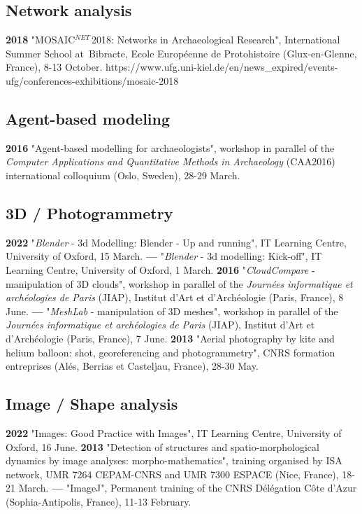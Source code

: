 \documentclass{article}
\begin{document}
\subsection*{Network analysis}

\textbf{2018 }"MOSAIC${}^{NET\ }$2018: Networks in Archaeological Research", International Summer School at~Bibracte, Ecole Europ\'{e}enne de Protohistoire (Glux-en-Glenne, France), 8-13 October. https://www.ufg.uni-kiel.de/en/news_expired/events-ufg/conferences-exhibitions/mosaic-2018

\subsection*{Agent-based modeling}

\textbf{2016 }"Agent-based modelling for archaeologists", workshop in parallel of the \textit{Computer Applications and Quantitative Methods in Archaeology} (CAA2016) international colloquium (Oslo, Sweden), 28-29 March.

\subsection*{3D / Photogrammetry}

\textbf{2022 }"\textit{Blender} - 3d Modelling: Blender - Up and running", IT Learning Centre, University of Oxford, 15 March.
\smallbreak
\textbf{--- }"\textit{Blender} - 3d modelling: Kick-off", IT Learning Centre, University of Oxford, 1 March.
\smallbreak
\textbf{2016 }"\textit{CloudCompare} - manipulation of 3D clouds", workshop in parallel of the \textit{Journ\'{e}es informatique et arch\'{e}ologies de Paris} (JIAP), Institut d'Art et d'Arch\'{e}ologie (Paris, France), 8 June.
\smallbreak
\textbf{--- }"\textit{MeshLab }- manipulation of 3D meshes", workshop in parallel of the \textit{Journ\'{e}es informatique et arch\'{e}ologies de Paris} (JIAP), Institut d'Art et d'Arch\'{e}ologie (Paris, France), 7 June.
\smallbreak
\textbf{2013 }"Aerial photography by kite and helium balloon: shot, georeferencing and photogrammetry", CNRS formation entreprises (Al\'{e}s, Berrias et Casteljau, France), 28-30 May.

\subsection*{Image / Shape analysis}

\textbf{2022 }"Images: Good Practice with Images", IT Learning Centre, University of Oxford, 16 June.
\smallbreak
\textbf{2013 }"Detection of structures and spatio-morphological dynamics by image analyses: morpho-mathematics", training organised by ISA network, UMR 7264 CEPAM-CNRS and UMR 7300 ESPACE (Nice, France), 18-21 March.
\smallbreak
\textbf{--- }"ImageJ", Permanent training of the CNRS D\'{e}l\'{e}gation C\^{o}te d'Azur (Sophia-Antipolis, France), 11-13 February.
\end{document}
